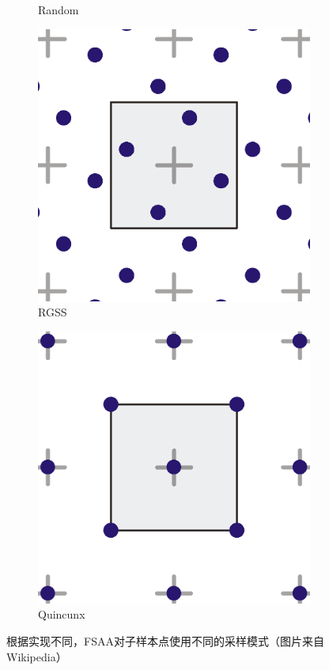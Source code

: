 \begin{figure}
\begin{fullwidth}
\begin{subfigure}[b]{0.24\thewidth}
		\caption{Random}
	\end{subfigure}
	\begin{subfigure}[b]{0.24\thewidth}
		\includegraphics[width=1.\textwidth]{figures/intro/Supersampling-RGSS}
		\caption{RGSS}
	\end{subfigure}
	\begin{subfigure}[b]{0.24\thewidth}
		\includegraphics[width=1.\textwidth]{figures/intro/Supersampling-Quincunx}
		\caption{Quincunx}
	\end{subfigure}
\caption{根据实现不同，FSAA对子样本点使用不同的采样模式（图片来自Wikipedia）}
\label{f:intro-Supersampling-pattern}
\end{fullwidth}
\end{figure}

